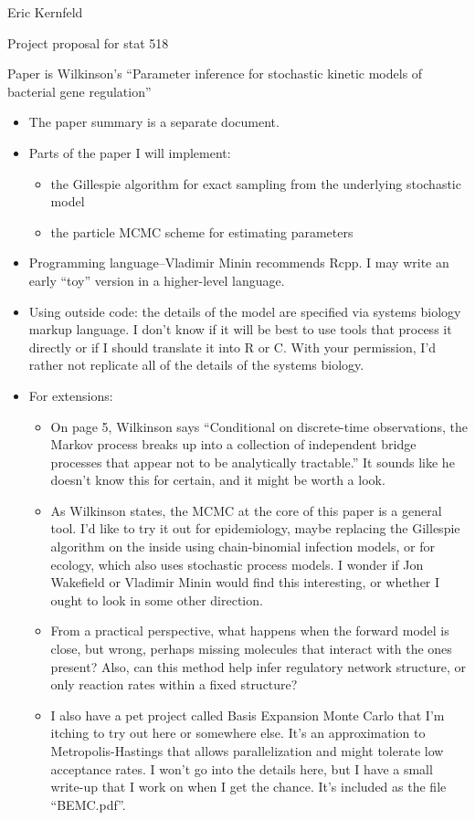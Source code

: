 \documentclass{article}
\begin{document}
Eric Kernfeld

Project proposal for stat 518

Paper is Wilkinson's ``Parameter inference for stochastic kinetic models of bacterial gene regulation''

\begin{itemize}
\item The paper summary is a separate document.
\item Parts of the paper I will implement:
	\begin{itemize}
	\item the Gillespie algorithm for exact sampling from the underlying stochastic model
	\item the particle MCMC scheme for estimating parameters
	\end{itemize}
\item Programming language--Vladimir Minin recommends Rcpp. I may write an early ``toy'' version in a higher-level language. 
\item Using outside code: the details of the model are specified via systems biology markup language. I don't know if it will be best to use tools that process it directly or if I should translate it into R or C. With your permission, I'd rather not replicate all of the details of the systems biology. 
\item For extensions: 
\begin{itemize}
\item On page 5, Wilkinson says ``Conditional on discrete-time observations, the Markov process breaks up into a collection of independent bridge processes that appear not to be analytically tractable.'' It sounds like he doesn't know this for certain, and it might be worth a look. 
\item As Wilkinson states, the MCMC at the core of this paper is a general tool. I'd like to try it out for epidemiology, maybe replacing the Gillespie algorithm on the inside using chain-binomial infection models, or for ecology, which also uses stochastic process models. I wonder if Jon Wakefield or Vladimir Minin would find this interesting, or whether I ought to look in some other direction.
\item From a practical perspective, what happens when the forward model is close, but wrong, perhaps missing molecules that interact with the ones present? Also, can this method help infer regulatory network structure, or only reaction rates within a fixed structure?
\item I also have a pet project called Basis Expansion Monte Carlo that I'm itching to try out here or somewhere else. It's an approximation to Metropolis-Hastings that allows parallelization and might tolerate low acceptance rates. I won't go into the details here, but I have a small write-up that I work on when I get the chance. It's included as the file ``BEMC.pdf''.

\end{itemize}
\end{itemize}
\end{document}
